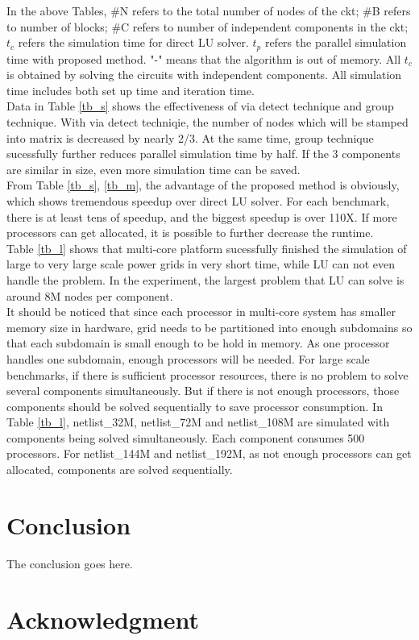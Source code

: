 \documentclass{sig-alternate}
\begin{document}
	In the above Tables, \#N refers to the total number of nodes of the ckt; \#B refers to number of blocks; \#C refers to number 
	of independent components in the 
	ckt; $t_c$ refers the simulation time for direct LU solver. $t_p$ refers the parallel simulation time with proposed method. "-"
	means that the algorithm is out of memory. All $t_c$ is obtained by solving the circuits with independent components. All 
	simulation time includes both set up time and iteration time.\\

	Data in Table \ref{tb_s} shows the effectiveness of via detect technique and group technique. With via detect techniqie, the 
	number of nodes which will be stamped into matrix is decreased by nearly 2/3. At the same time, group technique sucessfully
	further reduces parallel simulation time by half. If the 3 components are similar in size, even more simulation time can be
	saved.\\

	From Table \ref{tb_s}, \ref{tb_m}, the advantage of the proposed method is obviously, which shows tremendous 
	speedup over direct LU solver. For each benchmark, there is at least tens of speedup, and the biggest speedup is over 110X. 
	If more processors can get allocated, it is possible to further decrease the runtime.\\

	Table \ref{tb_l} shows that multi-core platform sucessfully finished the simulation of large to very large scale power grids
	in very short time, while LU can not even handle the problem. In the experiment, the largest problem that LU can solve is 
	around 8M nodes per component.\\ 

	It should be noticed that since each processor in multi-core system has smaller memory size in hardware, grid needs to be 
	partitioned into enough subdomains so that each subdomain is small enough to be hold in memory. As one processor handles one 
	subdomain, enough processors will be needed. For large scale benchmarks, if there is sufficient processor resources, there is
	no problem to solve several components simultaneously. But if there is not enough processors, those components should be 
	solved sequentially to save processor consumption. In Table \ref{tb_l}, netlist\_32M, netlist\_72M and netlist\_108M are 
	simulated with components being solved simultaneously. Each component consumes 500 processors. For netlist\_144M and 
	netlist\_192M, as not enough processors can get allocated, components are solved sequentially.\\

\section{Conclusion}
	The conclusion goes here\cite{package}.

\section*{Acknowledgment}



\end{document}
